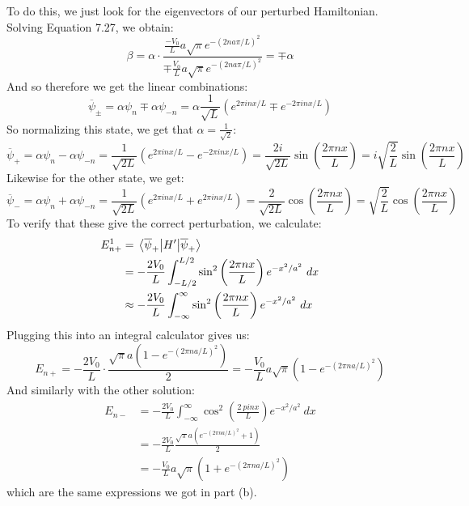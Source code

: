 \documentclass[10pt]{article}
\begin{document}
\begin{enumerate}[label=\alph*)]
				\begin{solution}
					To do this, we just look for the eigenvectors of our perturbed Hamiltonian. Solving Equation 7.27, we obtain: 
					\[ \beta = \alpha \cdot \frac{\frac{-V_0}{L} a \sqrt{\pi} e^{-(2na\pi/L)^2}}{\mp \frac{V_0}{L} a\sqrt{\pi}e^{-(2na\pi/L)^2}} = \mp \alpha \]
					And so therefore we get the linear combinations: 
					\[ \overline \psi_\pm = \alpha \psi_n \mp \alpha \psi_{-n} = \alpha \frac{1}{\sqrt{L}} \left( e^{2\pi i n x/L} \mp e^{-2\pi in x/L}\right)\]
					So normalizing this state, we get that $\alpha = \frac{1}{\sqrt{2}}$:
					\[ \overline \psi_+ = \alpha \psi_n - \alpha \psi_{-n} = \frac {1}{\sqrt{2L}} \left( e^{2\pi i n x/L} - e^{-2\pi in x/L}\right) = \frac{2i}{\sqrt{2L}}\sin\left( \frac{2\pi nx}{L}\right) = i\sqrt{\frac 2L} \sin \left( \frac{2 \pi n x}{L}\right) \]
					Likewise for the other state, we get: 
					\[ \overline \psi_- = \alpha \psi_n + \alpha \psi_{-n} = \frac{1}{\sqrt{2L}}\left( e^{2\pi inx/L} + e^{2\pi inx/L} \right) = \frac{2}{\sqrt{2L}} \cos\left( \frac{2\pi n x}{L}\right) = \sqrt{\frac 2L} \cos\left( \frac{2\pi nx}{L}\right)\]
					To verify that these give the correct perturbation, we calculate: 
					\begin{align*}
						E_{n+}^1 &= \expval{H'}{\overline \psi_+}\\
						&= -\frac{2V_0}{L} \int_{-L/2}^{L/2} \sin^2\left( \frac{2\pi nx}{L}\right) e^{-x^2/a^2}\ dx \\
						&\approx -\frac{2V_0}{L} \int_{-\infty}^\infty \sin^2\left( \frac{2\pi nx}{L}\right) e^{-x^2/a^2} \ dx
					\end{align*}
					Plugging this into an integral calculator gives us: 
					\[ E_{n+} = -\frac{2V_0}{L} \cdot \frac{\sqrt \pi a \left( 1 - e^{-(2 \pi n a/L)^2}\right)}{2} = -\frac{V_0}{L} a\sqrt{\pi}\left( 1 - e^{-(2 \pi n a/L)^2}\right)\]
					And similarly with the other solution: 
					\begin{align*}
						E_{n-} &= -\frac{2V_0}{L} \int_{-\infty}^\infty \cos^2 \left( \frac{2\ pi nx}{L}\right) e^{-x^2/a^2} \ dx\\
						&= -\frac{2V_0}{L} \frac{\sqrt{\pi} a \left(e^{-(2\pi n a/L)^2} + 1\right)}{2}\\
						&= -\frac{V_0}{L}a \sqrt{\pi} \left(1 + e^{-(2 \pi n a/L)^2}\right)
					\end{align*}
					which are the same expressions we got in part (b).
				\end{solution}
	\end{enumerate}
\end{document}
